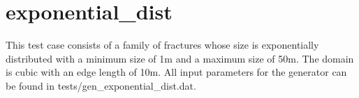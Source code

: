 \documentclass[letterpaper,10pt,english]{sphinxmanual}
\begin{document}
\begin{DUlineblock}{0em}
\item[] 
\item[] 
\end{DUlineblock}

{\hfill{}\hfill}


\section{exponential\_dist}
\label{tutorial:exponential-dist}
This test case consists of a family of fractures whose size is exponentially distributed with a minimum size of 1m and a maximum size of 50m. The domain is cubic with an edge length of 10m. All input parameters for the generator can be found in tests/gen\_exponential\_dist.dat.

{\hfill{}\hfill}

\begin{DUlineblock}{0em}
\item[] 
\item[] 
\end{DUlineblock}
\end{document}
